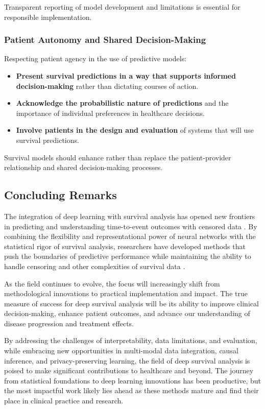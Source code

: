 Transparent reporting of model development and limitations is essential for responsible implementation.

\subsubsection{Patient Autonomy and Shared Decision-Making}

Respecting patient agency in the use of predictive models:

\begin{itemize}
    \item \textbf{Present survival predictions in a way that supports informed decision-making} rather than dictating courses of action.
    
    \item \textbf{Acknowledge the probabilistic nature of predictions} and the importance of individual preferences in healthcare decisions.
    
    \item \textbf{Involve patients in the design and evaluation} of systems that will use survival predictions.
\end{itemize}

Survival models should enhance rather than replace the patient-provider relationship and shared decision-making processes.

\subsection{Concluding Remarks}

The integration of deep learning with survival analysis has opened new frontiers in predicting and understanding time-to-event outcomes with censored data \parencite{lee2018,nagpal2021dsm,kvamme2019}. By combining the flexibility and representational power of neural networks with the statistical rigor of survival analysis, researchers have developed methods that push the boundaries of predictive performance while maintaining the ability to handle censoring and other complexities of survival data \parencite{zhong2021,chapfuwa2018,nagpal2021deepsurv}.

As the field continues to evolve, the focus will increasingly shift from methodological innovations to practical implementation and impact. The true measure of success for deep survival analysis will be its ability to improve clinical decision-making, enhance patient outcomes, and advance our understanding of disease progression and treatment effects.

By addressing the challenges of interpretability, data limitations, and evaluation, while embracing new opportunities in multi-modal data integration, causal inference, and privacy-preserving learning, the field of deep survival analysis is poised to make significant contributions to healthcare and beyond. The journey from statistical foundations to deep learning innovations has been productive, but the most impactful work likely lies ahead as these methods mature and find their place in clinical practice and research.
